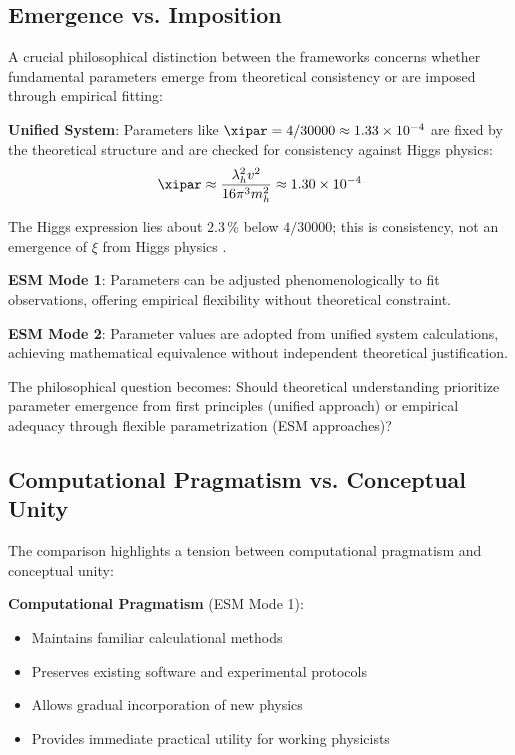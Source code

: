 	\subsection{Emergence vs. Imposition}
	\label{subsec:emergence_imposition}
	
	A crucial philosophical distinction between the frameworks concerns whether fundamental parameters emerge from theoretical consistency or are imposed through empirical fitting:
	
	\textbf{Unified System}: Parameters like $\xipar = 4/30000 \approx 1.33 \times 10^{-4}$ are fixed by the theoretical structure and are checked for consistency against Higgs physics:
	\begin{equation}
		\xipar \approx \frac{\lambda_h^2 v^2}{16\pi^3 m_h^2} \approx 1.30 \times 10^{-4}
	\end{equation}
	
	The Higgs expression lies about $2.3\,\%$ below $4/30000$; this is consistency, not an emergence of $\xi$ from Higgs physics \cite{pascher_beta_derivation_2025}.
	
	\textbf{ESM Mode 1}: Parameters can be adjusted phenomenologically to fit observations, offering empirical flexibility without theoretical constraint.
	
	\textbf{ESM Mode 2}: Parameter values are adopted from unified system calculations, achieving mathematical equivalence without independent theoretical justification.
	
	The philosophical question becomes: Should theoretical understanding prioritize parameter emergence from first principles (unified approach) or empirical adequacy through flexible parametrization (ESM approaches)? \cite{vanFraassen1980}
	
	\subsection{Computational Pragmatism vs. Conceptual Unity}
	\label{subsec:pragmatism_vs_elegance}
	
	The comparison highlights a tension between computational pragmatism and conceptual unity:
	
	\textbf{Computational Pragmatism} (ESM Mode 1):
	\begin{itemize}
		\item Maintains familiar calculational methods
		\item Preserves existing software and experimental protocols
		\item Allows gradual incorporation of new physics
		\item Provides immediate practical utility for working physicists
	\end{itemize}
	
